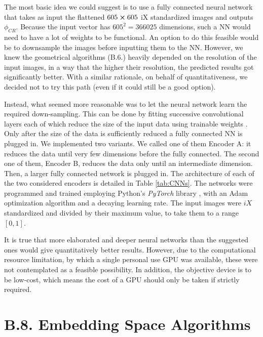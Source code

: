 \documentclass[11pt, a4paper, twoside]{article} %
\begin{document}
The most basic idea we could suggest is to use a fully connected neural network \cite{NN} that takes as input the flattened $605\cross 605$ iX standardized images and outputs $\phi_{CR}$. Because the input vector has $605^2=366025$ dimensions, such a NN would need to have a lot of weights to be functional. An option to do this feasible would be to downsample the images before inputting them to the NN. However, we knew the geometrical algorithms (B.6.) heavily depended on the resolution of the input images, in a way that the higher their resolution, the predicted results got significantly better. With a similar rationale, on behalf of quantitativeness, we decided not to try this path (even if it could still be a good option).

Instead, what seemed more reasonable was to let the neural network learn the required down-sampling. This can be done by fitting successive convolutional layers each of which reduce the size of the input data using trainable weights \cite{NN}. Only after the size of the data is sufficiently reduced a fully connected NN is plugged in. We implemented two variants. We called one of them Encoder A: it reduces the data until very few dimensions before the fully connected. The second one of them, Encoder B, reduces the data only until an intermediate dimension. Then, a larger fully connected network is plugged in. The architecture of each of the two considered encoders is detailed in Table \ref{tab:CNNs}. The networks were programmed and trained employing Python's {\em PyTorch} library \cite{pytorch}, with an Adam optimization algorithm \cite{adam} and a decaying learning rate. The input images were $iX$ standardized and divided by their maximum value, to take them to a range $[0,1]$.

It is true that more elaborated and deeper neural networks than the suggested ones would give quantitatively better results. However, due to the computational resource limitation, by which a single personal use GPU was available, these were not contemplated as a feasible possibility. In addition, the objective device is to be low-cost, which means the cost of a GPU should only be taken if strictly required.





\section*{B.8. Embedding Space Algorithms}
\end{document}
